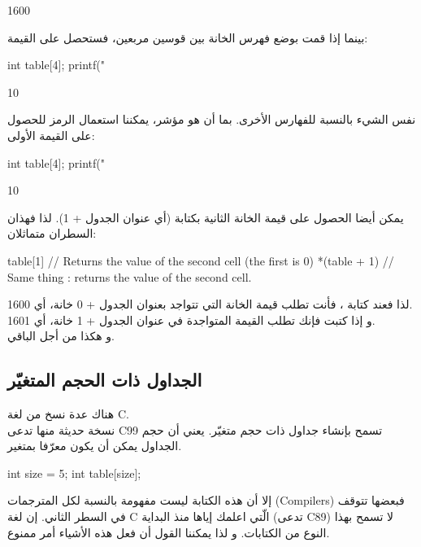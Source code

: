 \begin{Console}
1600
\end{Console}

بينما إذا قمت بوضع فهرس الخانة بين قوسين مربعين، فستحصل على القيمة:

\begin{Csource}
int table[4];
printf("%
\end{Csource}

\begin{Console}
10
\end{Console}

نفس الشيء بالنسبة للفهارس الأخرى. بما أن
هو مؤشر، يمكننا استعمال الرمز
\InlineCode{*}
للحصول على القيمة الأولى:

\begin{Csource}
int table[4];
printf("%
\end{Csource}

\begin{Console}
10
\end{Console}

يمكن أيضا الحصول على قيمة الخانة الثانية بكتابة
(أي عنوان الجدول + 1). لذا فهذان السطران متماثلان:

\begin{Csource}
table[1] // Returns the value of the second cell (the first is 0)
*(table + 1) // Same thing : returns the value of the second cell.
\end{Csource}

لذا فعند كتابة
،
فأنت تطلب قيمة الخانة التي تتواجد بعنوان الجدول + 0
خانة، أي 1600.\\
و إذا كتبت
فإنك تطلب القيمة المتواجدة في عنوان الجدول + 1
خانة، أي 1601.\\
و هكذا من أجل الباقي.

\subsection{الجداول ذات الحجم المتغيّر}

هناك عدة نسخ من لغة
\textenglish{C}.\\
نسخة حديثة منها تدعى
\textenglish{C99}
تسمح بإنشاء جداول ذات حجم متغيّر. يعني أن حجم الجداول يمكن أن يكون معرّفا بمتغير.

\begin{Csource}
int size = 5;
int table[size];
\end{Csource}

إلا أن هذه الكتابة ليست مفهومة بالنسبة لكل المترجمات
(\textenglish{Compilers})
فبعضها تتوقف في السطر الثاني. إن لغة
\textenglish{C}
الّتي اعلمك إياها منذ البداية (تدعى
\textenglish{C89})
لا تسمح بهذا النوع من الكتابات. و لذا يمكننا القول أن فعل هذه الأشياء أمر ممنوع.

